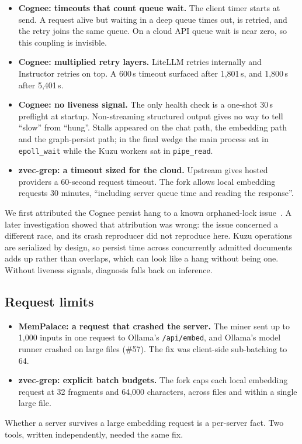 \documentclass[11pt]{article}
\newcommand{\code}[1]{\texttt{#1}}
\begin{document}
\begin{itemize}
  \item \textbf{Cognee: timeouts that count queue wait.} The client timer starts at send. A request
    alive but waiting in a deep queue times out, is retried, and the retry joins the same queue. On
    a cloud API queue wait is near zero, so this coupling is invisible.
  \item \textbf{Cognee: multiplied retry layers.} LiteLLM retries internally and Instructor retries
    on top. A 600\,s timeout surfaced after 1,801\,s, and 1,800\,s after 5,401\,s.
  \item \textbf{Cognee: no liveness signal.} The only health check is a one-shot 30\,s preflight at
    startup. Non-streaming structured output gives no way to tell ``slow'' from ``hung''. Stalls
    appeared on the chat path, the embedding path and the graph-persist path; in the final wedge the
    main process sat in \code{epoll\_wait} while the Kuzu workers sat in \code{pipe\_read}.
  \item \textbf{zvec-grep: a timeout sized for the cloud.} Upstream gives hosted providers a
    60-second request timeout. The fork allows local embedding requests 30 minutes, ``including
    server queue time and reading the response''.
\end{itemize}

We first attributed the Cognee persist hang to a known orphaned-lock issue~\cite{cognee3708}. A later
investigation showed that attribution was wrong: the issue concerned a different race, and its crash
reproducer did not reproduce here. Kuzu operations are serialized by design, so persist time across
concurrently admitted documents adds up rather than overlaps, which can look like a hang without
being one. Without liveness signals, diagnosis falls back on inference.

\subsection{Request limits}

\begin{itemize}
  \item \textbf{MemPalace: a request that crashed the server.} The miner sent up to 1,000 inputs in
    one request to Ollama's \code{/api/embed}, and Ollama's model runner crashed on large files
    (\#57). The fix was client-side sub-batching to 64.
  \item \textbf{zvec-grep: explicit batch budgets.} The fork caps each local embedding request at 32
    fragments and 64,000 characters, across files and within a single large file.
\end{itemize}
Whether a server survives a large embedding request is a per-server fact. Two tools, written
independently, needed the same fix.
\end{document}
